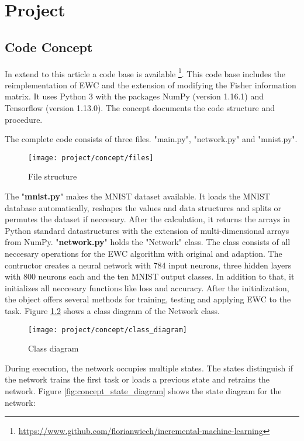 \chapter{Project}

\section{Code Concept}

In extend to this article a code base is available \footnote{\url{https://www.github.com/florianwiech/incremental-machine-learning}}.
This code base includes the reimplementation of EWC and the extension of modifying the Fisher information matrix.
It uses Python 3 with the packages NumPy (version 1.16.1) and Tensorflow (version 1.13.0).
The concept documents the code structure and procedure.

The complete code consists of three files.
"main.py", "network.py" and "mnist.py".

\begin{figure}[H]
    \centering
    \texttt{[image: project/concept/files]}
    \caption{File structure}
    \label{fig:concept_file_structure}
\end{figure}

The "\textbf{mnist.py}" makes the MNIST dataset available.
It loads the MNIST database automatically, reshapes the values and data structures and splits or permutes the dataset if neccesary.
After the calculation, it returns the arrays in Python standard datastructures with the extension of multi-dimensional arrays from NumPy.
\newline
"\textbf{network.py}" holds the "Network" class.
The class consists of all neccesary operations for the EWC algorithm with original and adaption.
The contructor creates a neural network with 784 input neurons, three hidden layers with 800 neurons each and the ten MNIST output classes.
In addition to that, it initializes all neccesary functions like loss and accuracy.
After the initialization, the object offers several methods for training, testing and applying EWC to the task.
Figure \ref{fig:concept_class_diagram} shows a class diagram of the Network class.

\begin{figure}[H]
    \centering
    \texttt{[image: project/concept/class\_diagram]}
    \caption{Class diagram}
    \label{fig:concept_class_diagram}
\end{figure}

During execution, the network occupies multiple states.
The states distinguish if the network trains the first task or loads a previous state and retrains the network.
Figure \ref{fig:concept_state_diagram} shows the state diagram for the network:

